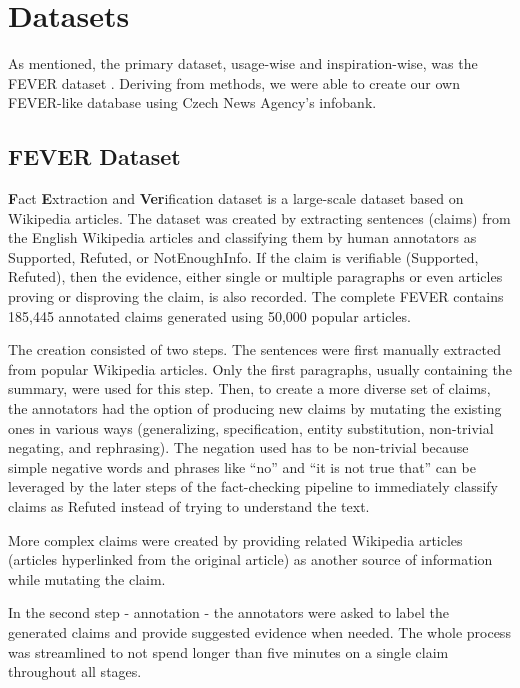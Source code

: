 \chapter{Datasets}
\label{chap:data}

As mentioned, the primary dataset, usage-wise and inspiration-wise, was the FEVER dataset \citep{fever}.
Deriving from \cite{fever} methods, we \citep{ullrich} were able to create our own FEVER-like database using Czech News Agency's infobank.

\section{FEVER Dataset}

\textbf{F}act \textbf{E}xtraction and \textbf{Ver}ification \citep{fever} dataset is a large-scale dataset based on Wikipedia articles.
The dataset was created by extracting sentences (claims) from the English Wikipedia articles and classifying them by human annotators as Supported, Refuted, or NotEnoughInfo.
If the claim is verifiable (Supported, Refuted), then the evidence, either single or multiple paragraphs or even articles proving or disproving the claim, is also recorded.
The complete FEVER contains 185,445 annotated claims generated using 50,000 popular articles.

The creation consisted of two steps. The sentences were first manually extracted from popular Wikipedia articles.
Only the first paragraphs, usually containing the summary, were used for this step. 
Then, to create a more diverse set of claims, the annotators had the option of producing new claims by mutating the existing ones in various ways (generalizing, specification, entity substitution, non-trivial negating, and rephrasing).
The negation used has to be non-trivial because simple negative words and phrases like ``no'' and ``it is not true that'' can be leveraged by the later steps of the fact-checking pipeline to immediately classify claims as Refuted instead of trying to understand the text.

More complex claims were created by providing related Wikipedia articles (articles hyperlinked from the original article) as another source of information while mutating the claim.

In the second step - annotation - the annotators were asked to label the generated claims and provide suggested evidence when needed.
The whole process was streamlined to not spend longer than five minutes on a single claim throughout all stages.

